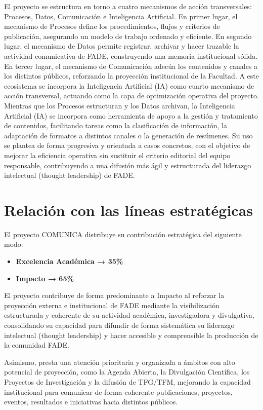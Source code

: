 \documentclass[11pt,a4paper]{scrreprt}
\begin{document}
El proyecto se estructura en torno a cuatro mecanismos de acción transversales: Procesos, Datos, Comunicación e Inteligencia Artificial. En primer lugar, el mecanismo de Procesos define los procedimientos, flujos y criterios de publicación, asegurando un modelo de trabajo ordenado y eficiente. En segundo lugar, el mecanismo de Datos permite registrar, archivar y hacer trazable la actividad comunicativa de FADE, construyendo una memoria institucional sólida. En tercer lugar, el mecanismo de Comunicación adecúa los contenidos y canales a los distintos públicos, reforzando la proyección institucional de la Facultad. A este ecosistema se incorpora la Inteligencia Artificial (IA) como cuarto mecanismo de acción transversal, actuando como la capa de optimización operativa del proyecto. Mientras que los Procesos estructuran y los Datos archivan, la Inteligencia Artificial (IA) se incorpora como herramienta de apoyo a la gestión y tratamiento de contenidos, facilitando tareas como la clasificación de información, la adaptación de formatos a distintos canales o la generación de resúmenes. Su uso se plantea de forma progresiva y orientada a casos concretos, con el objetivo de mejorar la eficiencia operativa sin sustituir el criterio editorial del equipo responsable, contribuyendo a una difusión más ágil y estructurada del liderazgo intelectual (thought leadership) de FADE.

\section{Relación con las líneas estratégicas}

\small
El proyecto COMUNICA distribuye su contribución estratégica del siguiente modo:

\begin{itemize}[noitemsep,topsep=2pt]
\item \textbf{Excelencia Académica → 35\%}
\item \textbf{Impacto → 65\%}
\end{itemize}

El proyecto contribuye de forma predominante a Impacto al reforzar la proyección externa e institucional de FADE mediante la visibilización estructurada y coherente de su actividad académica, investigadora y divulgativa, consolidando su capacidad para difundir de forma sistemática su liderazgo intelectual (thought leadership) y hacer accesible y comprensible la producción de la comunidad FADE.

Asimismo, presta una atención prioritaria y organizada a ámbitos con alto potencial de proyección, como la Agenda Abierta, la Divulgación Científica, los Proyectos de Investigación y la difusión de TFG/TFM, mejorando la capacidad institucional para comunicar de forma coherente publicaciones, proyectos, eventos, resultados e iniciativas hacia distintos públicos.
\end{document}
